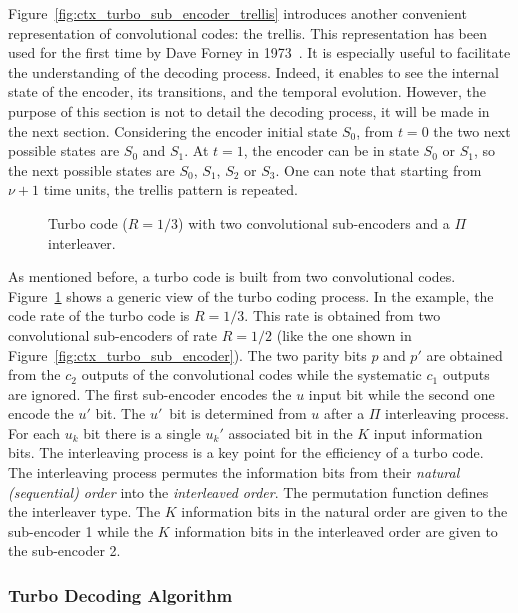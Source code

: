 Figure~\ref{fig:ctx_turbo_sub_encoder_trellis} introduces another convenient
representation of convolutional codes: the trellis. This representation has
been used for the first time by Dave Forney in 1973~\cite{Forney1973}. It is
especially useful to facilitate the understanding of the decoding process.
Indeed, it enables to see the internal state of the encoder, its transitions,
and the temporal evolution. However, the purpose of this section is not to
detail the decoding process, it will be made in the next section. Considering
the encoder initial state $S_0$, from $t = 0$ the two next possible states are
$S_0$ and $S_1$. At $t = 1$, the encoder can be in state $S_0$ or $S_1$, so the
next possible states are $S_0$, $S_1$, $S_2$ or $S_3$. One can note that
starting from $\nu +1$ time units, the trellis pattern is repeated.

\begin{figure}[htp]
  \centering
  \caption{Turbo code ($R = 1/3$) with two convolutional sub-encoders and a
    $\Pi$ interleaver.}
  \label{fig:ctx_turbo_encoder}
\end{figure}

As mentioned before, a turbo code is built from two convolutional codes.
Figure~\ref{fig:ctx_turbo_encoder} shows a generic view of the turbo coding
process. In the example, the code rate of the turbo code is $R = 1/3$. This rate
is obtained from two convolutional sub-encoders of rate $R = 1/2$ (like the one
shown in Figure~\ref{fig:ctx_turbo_sub_encoder}). The two parity bits $p$ and
$p'$ are obtained from the $c_2$ outputs of the convolutional codes while the
systematic $c_1$ outputs are ignored. The first sub-encoder encodes the $u$
input bit while the second one encode the $u'$ bit. The $u'$~bit is determined
from $u$ after a $\Pi$ interleaving process. For each $u_k$ bit there is a
single $u_k'$ associated bit in the $K$ input information bits. The interleaving
process is a key point for the efficiency of a turbo code. The interleaving
process permutes the information bits from their \emph{natural
(sequential) order} into the \emph{interleaved order}. The permutation function
defines the interleaver type. The $K$ information bits in the natural order are
given to the sub-encoder 1 while the $K$ information bits in the interleaved
order are given to the sub-encoder 2.

\subsubsection{Turbo Decoding Algorithm}
\label{sec:turbo_overview}

